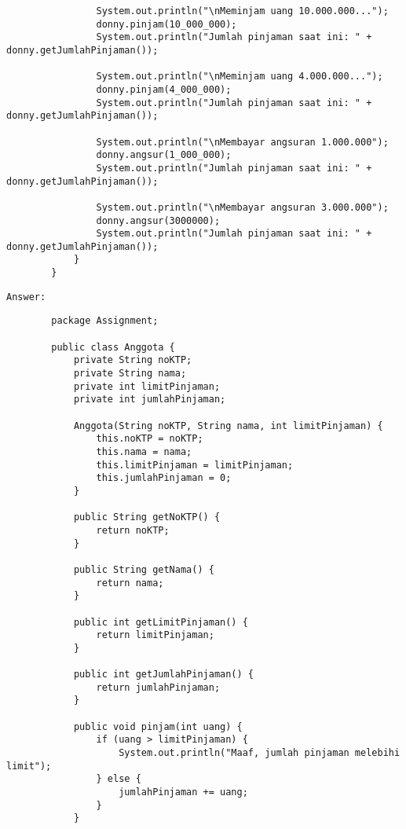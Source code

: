 \documentclass[12pt,titlepage]{article}
\begin{document}
\begin{enumerate}
\begin{verbatim}
                System.out.println("\nMeminjam uang 10.000.000...");
                donny.pinjam(10_000_000);
                System.out.println("Jumlah pinjaman saat ini: " + donny.getJumlahPinjaman());
                
                System.out.println("\nMeminjam uang 4.000.000...");
                donny.pinjam(4_000_000);
                System.out.println("Jumlah pinjaman saat ini: " + donny.getJumlahPinjaman());
                
                System.out.println("\nMembayar angsuran 1.000.000");
                donny.angsur(1_000_000);
                System.out.println("Jumlah pinjaman saat ini: " + donny.getJumlahPinjaman());

                System.out.println("\nMembayar angsuran 3.000.000");
                donny.angsur(3000000);
                System.out.println("Jumlah pinjaman saat ini: " + donny.getJumlahPinjaman());
            }
        }

    \end{verbatim}
    \texttt{Answer:} 
    \begin{verbatim}
        package Assignment;

        public class Anggota {
            private String noKTP;
            private String nama;
            private int limitPinjaman;
            private int jumlahPinjaman;

            Anggota(String noKTP, String nama, int limitPinjaman) {
                this.noKTP = noKTP;
                this.nama = nama;
                this.limitPinjaman = limitPinjaman;
                this.jumlahPinjaman = 0;
            }

            public String getNoKTP() {
                return noKTP;
            }

            public String getNama() {
                return nama;
            }

            public int getLimitPinjaman() {
                return limitPinjaman;
            }

            public int getJumlahPinjaman() {
                return jumlahPinjaman;
            }

            public void pinjam(int uang) {
                if (uang > limitPinjaman) {
                    System.out.println("Maaf, jumlah pinjaman melebihi limit");
                } else {
                    jumlahPinjaman += uang;
                }
            }


\end{verbatim}
\end{enumerate}
\end{document}
